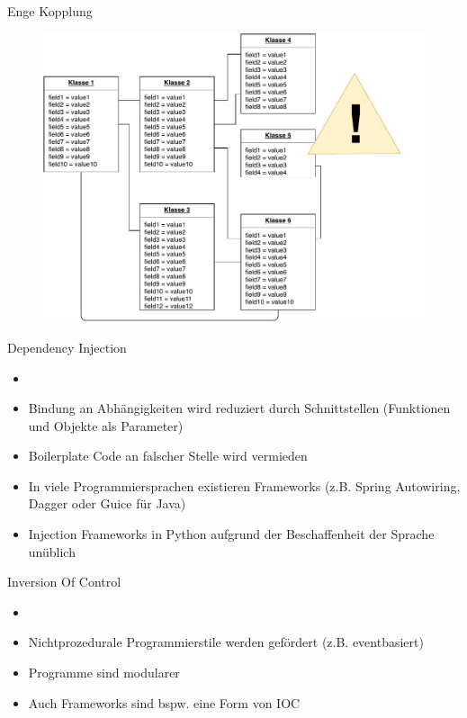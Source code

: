 \begin{frame}{Enge Kopplung}
    	  \begin{figure}[!htb]
        \includegraphics[scale=0.5]{img/tightcoupling}
    \end{figure}
\end{frame}


\begin{frame}{Dependency Injection}
 \begin{itemize}
        \setlength{\itemindent}{1.3in}
        \item [\textbf{Dependency Injection}]
    \end{itemize}

    \begin{itemize}
        \item Bindung an Abhängigkeiten wird reduziert durch Schnittstellen (Funktionen und Objekte als Parameter)
        \item Boilerplate Code an falscher Stelle wird vermieden
        \item In viele Programmiersprachen existieren Frameworks (z.B. Spring Autowiring, Dagger oder Guice für Java)
        \item Injection Frameworks in Python aufgrund der Beschaffenheit der Sprache unüblich
   \end{itemize}

\end{frame}


\begin{frame}{Inversion Of Control}
\begin{itemize}
        \setlength{\itemindent}{1.25in}
        \item [\textbf{Inversion Of Control}]
    \end{itemize}

    \begin{itemize}
        \item Nichtprozedurale Programmierstile werden gefördert (z.B. eventbasiert)
        \item Programme sind modularer
        \item Auch Frameworks sind bspw. eine Form von IOC
   \end{itemize}

\end{frame}


